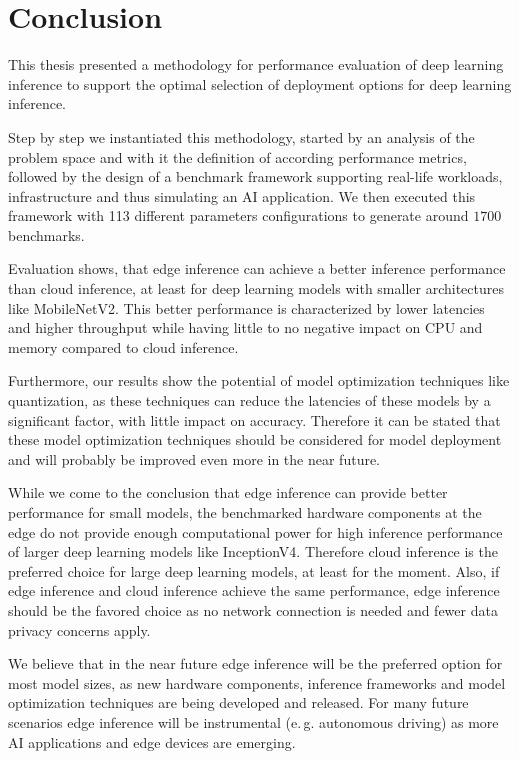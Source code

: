 \chapter{Conclusion}
\label{chap:conclusion}

This thesis presented a methodology for performance evaluation of deep learning inference to support the optimal selection of deployment options for deep learning inference.

Step by step we instantiated this methodology, started by an analysis of the problem space and with it the definition of according performance metrics, followed by the design of a benchmark framework supporting real-life workloads, infrastructure and thus simulating an AI application.
We then executed this framework with 113 different parameters configurations to generate around $1700$ benchmarks.

Evaluation shows, that edge inference can achieve a better inference performance than cloud inference, at least for deep learning models with smaller architectures like MobileNetV2.
This better performance is characterized by lower latencies and higher throughput while having little to no negative impact on CPU and memory compared to cloud inference.

Furthermore, our results show the potential of model optimization techniques like quantization, as these techniques can reduce the latencies of these models by a significant factor, with little impact on accuracy.
Therefore it can be stated that these model optimization techniques should be considered for model deployment and will probably be improved even more in the near future.

While we come to the conclusion that edge inference can provide better performance for small models, the benchmarked hardware components at the edge do not provide enough computational power for high inference performance of larger deep learning models like InceptionV4.
Therefore cloud inference is the preferred choice for large deep learning models, at least for the moment.
Also, if edge inference and cloud inference achieve the same performance, edge inference should be the favored choice as no network connection is needed and fewer data privacy concerns apply.

We believe that in the near future edge inference will be the preferred option for most model sizes, as new hardware components, inference frameworks and model optimization techniques are being developed and released.
For many future scenarios edge inference will be instrumental (e.\,g. autonomous driving) as more AI applications and edge devices are emerging.


